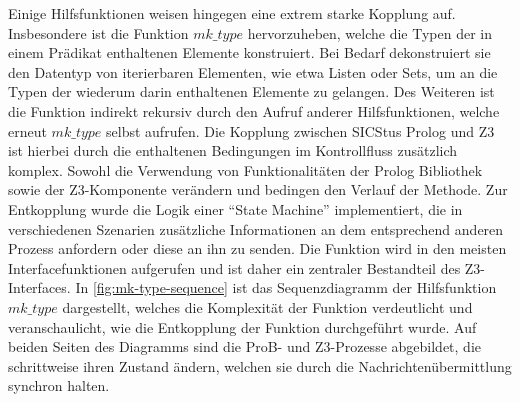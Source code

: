 Einige Hilfsfunktionen weisen hingegen eine extrem starke Kopplung auf.
Insbesondere ist die Funktion $mk\_type$ hervorzuheben, welche die Typen der in einem Prädikat enthaltenen Elemente konstruiert.
Bei Bedarf dekonstruiert sie den Datentyp von iterierbaren Elementen, wie etwa Listen oder Sets, um an die Typen der wiederum darin enthaltenen Elemente zu gelangen.
Des Weiteren ist die Funktion indirekt rekursiv durch den Aufruf anderer Hilfsfunktionen, welche erneut $mk\_type$ selbst aufrufen.
Die Kopplung zwischen SICStus Prolog und Z3 ist hierbei durch die enthaltenen Bedingungen im Kontrollfluss zusätzlich komplex.
Sowohl die Verwendung von Funktionalitäten der Prolog Bibliothek sowie der Z3-Komponente verändern und bedingen den Verlauf der Methode.
Zur Entkopplung wurde die Logik einer \enquote{State Machine} implementiert, die in verschiedenen Szenarien zusätzliche Informationen
an dem entsprechend anderen Prozess anfordern oder diese an ihn zu senden.
Die Funktion wird in den meisten Interfacefunktionen aufgerufen und ist daher ein zentraler Bestandteil des Z3-Interfaces.
In \cref{fig:mk-type-sequence} ist das Sequenzdiagramm der Hilfsfunktion $mk\_type$ dargestellt, welches die Komplexität der Funktion verdeutlicht
und veranschaulicht, wie die Entkopplung der Funktion durchgeführt wurde.
Auf beiden Seiten des Diagramms sind die ProB- und Z3-Prozesse abgebildet, die schrittweise ihren Zustand ändern, welchen sie durch die Nachrichtenübermittlung synchron halten.


